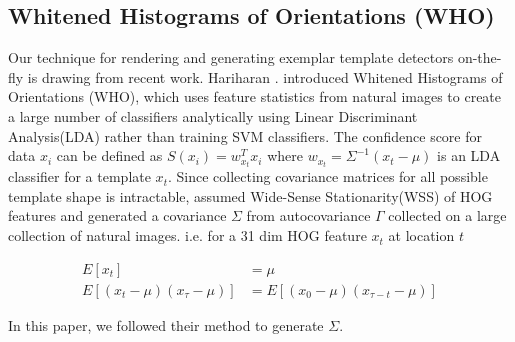 \subsection{Whitened Histograms of Orientations (WHO)}
\label{sec:who}
Our technique for rendering and generating exemplar template detectors
on-the-fly is drawing from recent work. Hariharan \etal. introduced Whitened
Histograms of Orientations (WHO), which uses feature statistics from natural
images to create a large number of classifiers analytically using Linear
Discriminant Analysis(LDA) rather than training SVM
classifiers\cite{Hariharan12}. The confidence score for data $x_i$ can be
defined as $ S(x_i) = w_{x_t}^T x_i$ where $w_{x_t} = \Sigma^{-1} (x_t - \mu)$
is an LDA classifier for a template $x_t$. Since collecting covariance matrices
for all possible template shape is intractable, \cite{Hariharan12} assumed
Wide-Sense Stationarity(WSS) of HOG features and generated a covariance
$\Sigma$ from autocovariance $\Gamma$ collected on a large collection of
natural images. i.e. for a 31 dim HOG feature $x_t$ at location $t$

\begin{align}
    E[x_t] & = \mu\\
    E[(x_{t} - \mu ) (x_{\tau} - \mu)] & = E[(x_0 - \mu)(x_{\tau - t} - \mu)]
\end{align}

In this paper, we followed their method to generate $\Sigma$.




% 
% 


